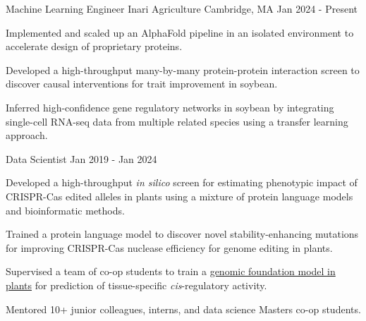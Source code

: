 

\begin{cventries}

  \cventry
    {Machine Learning Engineer} %
    {Inari Agriculture} %
    {Cambridge, MA} %
    {Jan 2024 - Present} %
    {
      \begin{cvitems} %
        \item {Implemented and scaled up an AlphaFold pipeline in an isolated environment to accelerate design of proprietary proteins.}
        \item {Developed a high-throughput many-by-many protein-protein interaction screen to discover causal interventions for trait improvement in soybean.}
        \item {Inferred high-confidence gene regulatory networks in soybean by integrating single-cell RNA-seq data from multiple related species using a transfer learning approach.}
      \end{cvitems}
    }

    \cventry
    {Data Scientist} %
    {} %
    {} %
    {Jan 2019 - Jan 2024} %
    {
      \begin{cvitems} %
        \item {Developed a high-throughput \textit{in silico} screen for estimating phenotypic impact of CRISPR-Cas edited alleles in plants using a mixture of protein language models and bioinformatic methods.}
        \item {Trained a protein language model to discover novel stability-enhancing mutations for improving CRISPR-Cas nuclease efficiency for genome editing in plants.}
        \item {Supervised a team of co-op students to train a \href{https://assets-eu.researchsquare.com/files/rs-1927200/v1_covered.pdf}{genomic foundation model in plants} for prediction of tissue-specific \textit{cis}-regulatory activity.}
        \item {Mentored 10+ junior colleagues, interns, and data science Masters co-op students.}
      \end{cvitems}
    }


\end{cventries}
